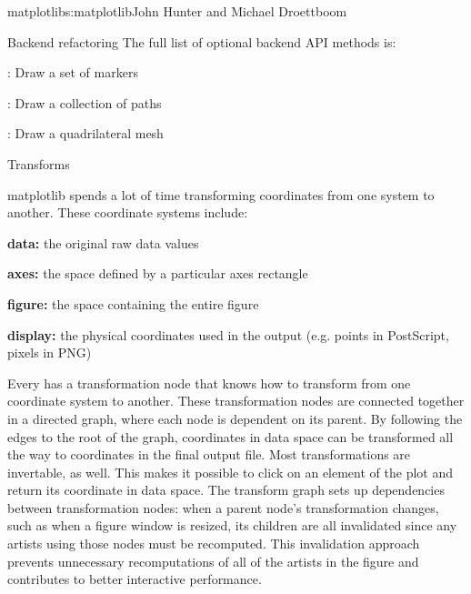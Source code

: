 \begin{aosachapter}{matplotlib}{s:matplotlib}{John Hunter and Michael Droettboom}
\begin{aosasect1}{Backend refactoring}
The full list of optional backend API methods is:

\begin{aosaitemize}

  \item {}: Draw a set of markers

  \item {}: Draw a collection of paths

  \item {}: Draw a quadrilateral mesh

\end{aosaitemize}

\end{aosasect1}

\begin{aosasect1}{Transforms}


matplotlib spends a lot of time transforming coordinates from one
system to another.  These coordinate systems include:

\begin{aosaitemize}
\item \textbf{data:} the original raw data values

\item \textbf{axes:} the space defined by a particular axes rectangle

\item \textbf{figure:} the space containing the entire figure

\item \textbf{display:} the physical coordinates used in the output
  (e.g. points in PostScript, pixels in PNG)
\end{aosaitemize}

Every  has a transformation node that knows how to
transform from one coordinate system to another.  These transformation
nodes are connected together in a directed graph, where each node is
dependent on its parent.  By following the edges to the root of the
graph, coordinates in data space can be transformed all the way to
coordinates in the final output file.  Most transformations are
invertable, as well.  This makes it possible to click on an element of
the plot and return its coordinate in data space.  The transform graph
sets up dependencies between transformation nodes: when a parent
node's transformation changes, such as when a figure window is
resized, its children are all invalidated since any artists using
those nodes must be recomputed.  This invalidation approach prevents
unnecessary recomputations of all of the artists in the figure and
contributes to better interactive performance.


\end{aosasect1}
\end{aosachapter}
